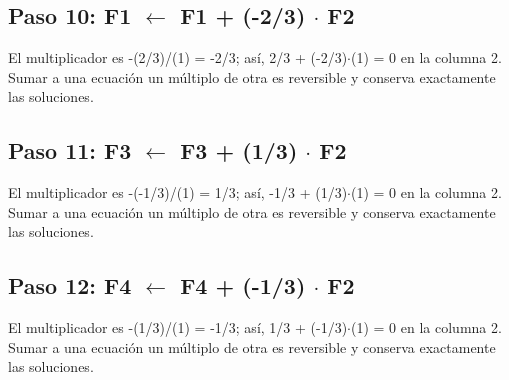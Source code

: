 \documentclass[conference]{IEEEtran}
\begin{document}
\medskip
\subsection*{Paso 10: F1 \(\leftarrow\) F1 + (-2/3) \(\cdot\) F2}
El multiplicador es -(2/3)/(1) = -2/3; así, 2/3 + (-2/3)\(\cdot\)(1) = 0 en la columna 2. Sumar a una ecuación un múltiplo de otra es reversible y conserva exactamente las soluciones.


\medskip
\subsection*{Paso 11: F3 \(\leftarrow\) F3 + (1/3) \(\cdot\) F2}
El multiplicador es -(-1/3)/(1) = 1/3; así, -1/3 + (1/3)\(\cdot\)(1) = 0 en la columna 2. Sumar a una ecuación un múltiplo de otra es reversible y conserva exactamente las soluciones.


\medskip
\subsection*{Paso 12: F4 \(\leftarrow\) F4 + (-1/3) \(\cdot\) F2}
El multiplicador es -(1/3)/(1) = -1/3; así, 1/3 + (-1/3)\(\cdot\)(1) = 0 en la columna 2. Sumar a una ecuación un múltiplo de otra es reversible y conserva exactamente las soluciones.
\end{document}
